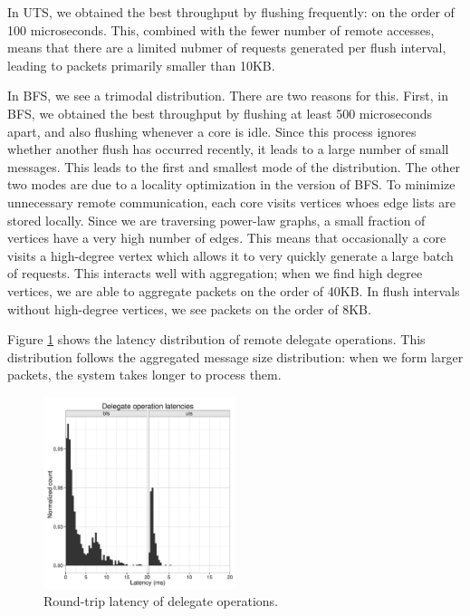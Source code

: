 In UTS, we obtained the best throughput by flushing frequently: on the
order of 100 microseconds. This, combined with the fewer number of remote
accesses, means that there are a limited nubmer of requests generated
per flush interval, leading to packets primarily smaller than 10KB.

In BFS, we see a trimodal distribution. There are two reasons for this. First, in BFS, we obtained the best throughput by flushing at least 500 microseconds apart, and also flushing whenever a core is idle. Since this process ignores whether another flush has occurred recently, it leads to a large number of small messages. This leads to the first and smallest mode of the distribution.  The other two modes are due to a locality optimization in the \Grappa version of BFS. To minimize unnecessary remote communication, each core visits vertices whoes edge lists are stored locally. Since we are traversing power-law graphs, a small fraction of vertices have a very high number of edges. This means that occasionally a core visits a high-degree vertex which allows it to very quickly generate a large batch of requests. This interacts well with aggregation; when we find high degree vertices, we are able to aggregate packets on the order of 40KB. In flush intervals without high-degree vertices, we see packets on the order of 8KB.

Figure \ref{fig:grappa-latency} shows the latency distribution of
remote delegate operations. This distribution follows the aggregated
message size distribution: when we form larger packets, the system
takes longer to process them.


\begin{figure}[ht]
    \begin{center}
      \includegraphics[width=0.5\textwidth]{results/histograms/latency_cmb.pdf}
    \end{center}
    \caption{Round-trip latency of delegate operations.}
    \label{fig:grappa-latency}
\end{figure}

